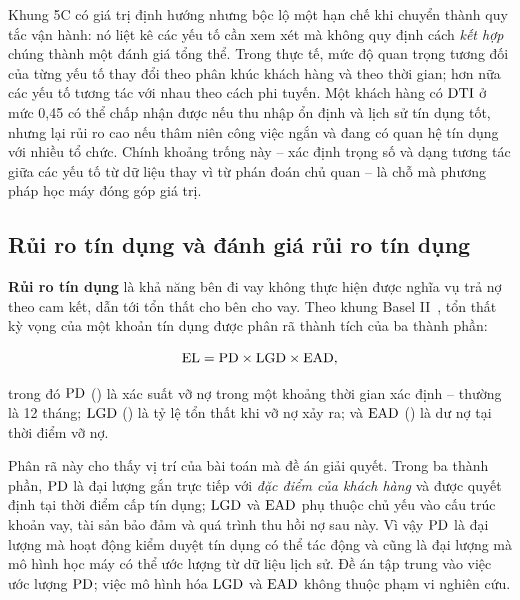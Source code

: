 Khung 5C có giá trị định hướng nhưng bộc lộ một hạn chế khi chuyển thành quy tắc
vận hành: nó liệt kê các yếu tố cần xem xét mà không quy định cách \textit{kết
hợp} chúng thành một đánh giá tổng thể. Trong thực tế, mức độ quan trọng tương
đối của từng yếu tố thay đổi theo phân khúc khách hàng và theo thời gian; hơn nữa
các yếu tố tương tác với nhau theo cách phi tuyến. Một khách hàng có $\mathrm{DTI}$ ở mức
0,45 có thể chấp nhận được nếu thu nhập ổn định và lịch sử tín dụng tốt, nhưng
lại rủi ro cao nếu thâm niên công việc ngắn và đang có quan hệ tín dụng với nhiều
tổ chức. Chính khoảng trống này -- xác định trọng số và dạng tương tác giữa các
yếu tố từ dữ liệu thay vì từ phán đoán chủ quan -- là chỗ mà phương pháp học máy
đóng góp giá trị.

\subsection{Rủi ro tín dụng và đánh giá rủi ro tín dụng}
\label{subsec:rui-ro-tin-dung}

\textbf{Rủi ro tín dụng} là khả năng bên đi vay không thực hiện được nghĩa vụ trả
nợ theo cam kết, dẫn tới tổn thất cho bên cho vay. Theo khung Basel
II~\cite{bcbs2006}, tổn thất kỳ vọng của một khoản tín dụng được phân rã thành
tích của ba thành phần:

\begin{equation}
\mathrm{EL} = \mathrm{PD} \times \mathrm{LGD} \times \mathrm{EAD},
\label{eq:expected-loss}
\end{equation}

trong đó $\mathrm{PD}$ () là xác suất vỡ nợ trong một khoảng
thời gian xác định -- thường là 12 tháng; $\mathrm{LGD}$ () là tỷ
lệ tổn thất khi vỡ nợ xảy ra; và $\mathrm{EAD}$ () là dư nợ tại
thời điểm vỡ nợ.

Phân rã này cho thấy vị trí của bài toán mà đề án giải quyết. Trong ba thành
phần, $\mathrm{PD}$ là đại lượng gắn trực tiếp với \textit{đặc điểm của khách hàng} và
được quyết định tại thời điểm cấp tín dụng; $\mathrm{LGD}$ và $\mathrm{EAD}$ phụ thuộc chủ yếu
vào cấu trúc khoản vay, tài sản bảo đảm và quá trình thu hồi nợ sau này. Vì vậy
$\mathrm{PD}$ là đại lượng mà hoạt động kiểm duyệt tín dụng có thể tác động và cũng là
đại lượng mà mô hình học máy có thể ước lượng từ dữ liệu lịch sử. Đề án tập trung
vào việc ước lượng $\mathrm{PD}$; việc mô hình hóa $\mathrm{LGD}$ và $\mathrm{EAD}$ không thuộc phạm vi
nghiên cứu.

